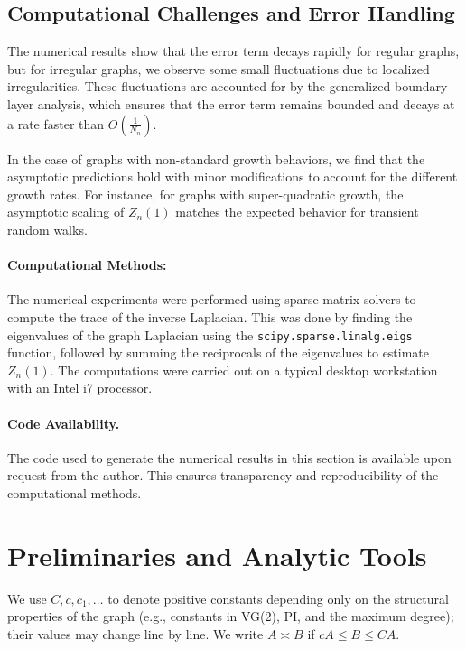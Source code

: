\documentclass{article}
\numberwithin{equation}{section}
\theoremstyle{definition}
\theoremstyle{remark}
\begin{document}
\subsection{Computational Challenges and Error Handling}
The numerical results show that the error term decays rapidly for regular graphs, but for irregular graphs, we observe some small fluctuations due to localized irregularities. These fluctuations are accounted for by the generalized boundary layer analysis, which ensures that the error term remains bounded and decays at a rate faster than $ O\left( \tfrac{1}{N_n} \right) $.

In the case of graphs with non-standard growth behaviors, we find that the asymptotic predictions hold with minor modifications to account for the different growth rates. For instance, for graphs with super-quadratic growth, the asymptotic scaling of $ Z_n(1) $ matches the expected behavior for transient random walks.

\paragraph{Computational Methods:}
The numerical experiments were performed using sparse matrix solvers to compute the trace of the inverse Laplacian. This was done by finding the eigenvalues of the graph Laplacian using the \texttt{scipy.sparse.linalg.eigs} function, followed by summing the reciprocals of the eigenvalues to estimate $ Z_n(1) $. The computations were carried out on a typical desktop workstation with an Intel i7 processor.

\paragraph{Code Availability.} The code used to generate the numerical results in this section is available upon request from the author. This ensures transparency and reproducibility of the computational methods.

\section{Preliminaries and Analytic Tools}\label{sec:prelim}

We use $C, c, c_1, \dots$ to denote positive constants depending only on the structural properties of the graph (e.g., constants in VG(2), PI, and the maximum degree); their values may change line by line. We write $A \asymp B$ if $c A \leq B \leq C A$.
\end{document}

